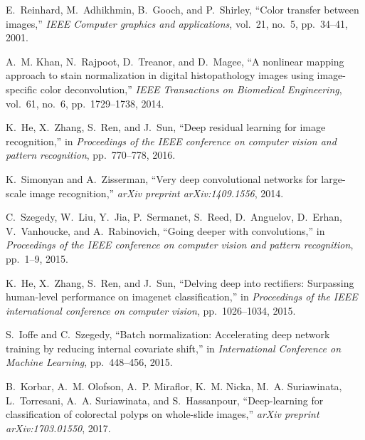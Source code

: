 \documentclass[runningheads,a4paper]{llncs}
\begin{document}
\begin{thebibliography}{10}
E.~Reinhard, M.~Adhikhmin, B.~Gooch, and P.~Shirley, ``Color transfer between
  images,'' {\em IEEE Computer graphics and applications}, vol.~21, no.~5,
  pp.~34--41, 2001.

A.~M. Khan, N.~Rajpoot, D.~Treanor, and D.~Magee, ``A nonlinear mapping
  approach to stain normalization in digital histopathology images using
  image-specific color deconvolution,'' {\em IEEE Transactions on Biomedical
  Engineering}, vol.~61, no.~6, pp.~1729--1738, 2014.

K.~He, X.~Zhang, S.~Ren, and J.~Sun, ``Deep residual learning for image
  recognition,'' in {\em Proceedings of the IEEE conference on computer vision
  and pattern recognition}, pp.~770--778, 2016.

K.~Simonyan and A.~Zisserman, ``Very deep convolutional networks for
  large-scale image recognition,'' {\em arXiv preprint arXiv:1409.1556}, 2014.

C.~Szegedy, W.~Liu, Y.~Jia, P.~Sermanet, S.~Reed, D.~Anguelov, D.~Erhan,
  V.~Vanhoucke, and A.~Rabinovich, ``Going deeper with convolutions,'' in {\em
  Proceedings of the IEEE conference on computer vision and pattern
  recognition}, pp.~1--9, 2015.

K.~He, X.~Zhang, S.~Ren, and J.~Sun, ``Delving deep into rectifiers: Surpassing
  human-level performance on imagenet classification,'' in {\em Proceedings of
  the IEEE international conference on computer vision}, pp.~1026--1034, 2015.

S.~Ioffe and C.~Szegedy, ``Batch normalization: Accelerating deep network
  training by reducing internal covariate shift,'' in {\em International
  Conference on Machine Learning}, pp.~448--456, 2015.

B.~Korbar, A.~M. Olofson, A.~P. Miraflor, K.~M. Nicka, M.~A. Suriawinata,
  L.~Torresani, A.~A. Suriawinata, and S.~Hassanpour, ``Deep-learning for
  classification of colorectal polyps on whole-slide images,'' {\em arXiv
  preprint arXiv:1703.01550}, 2017.

\end{thebibliography}
\end{document}
